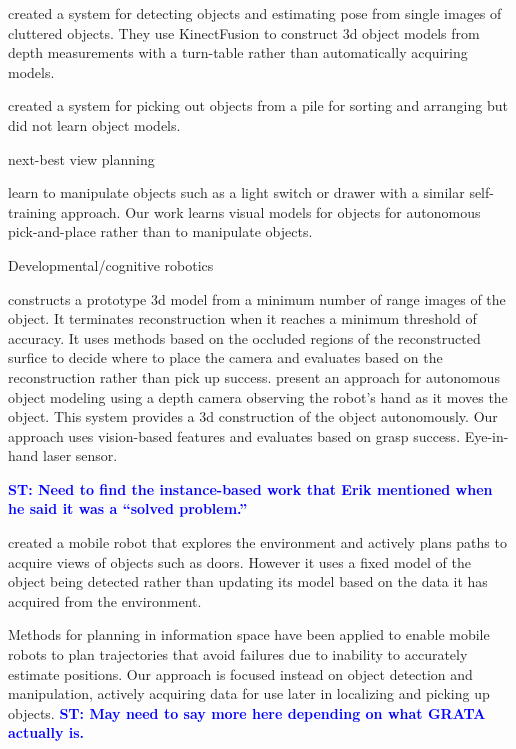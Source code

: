 \documentclass[conference]{IEEEtran}
\newcommand{\stnote}[1]{\textcolor{blue}{\textbf{ST: #1}}}
\begin{document}
\citet{zhu14} created a system for detecting objects and estimating
pose from single images of cluttered objects.  They use KinectFusion
to construct 3d object models from depth measurements with a
turn-table rather than automatically acquiring models.

\citet{chang12} created a system for picking out objects from a pile
for sorting and arranging but did not learn object models.  

next-best view planning~\citep{kriegel11}

\citet{nguyen14} learn to manipulate objects such as a light switch or
drawer with a similar self-training approach.  Our work learns visual
models for objects for autonomous pick-and-place rather than to
manipulate objects.

Developmental/cognitive robotics~\citep{lyubova13, kraft10r}

\citet{banta00} constructs a prototype 3d model from a minimum number
of range images of the object.  It terminates reconstruction when it
reaches a minimum threshold of accuracy.  It uses methods based on the
occluded regions of the reconstructed surfice to decide where to place
the camera and evaluates based on the reconstruction rather than pick
up success.  \citet{krainin11} present an approach for autonomous
object modeling using a depth camera observing the robot's hand as it
moves the object.  This system provides a 3d construction of the
object autonomously.  Our approach uses vision-based features and
evaluates based on grasp success.  Eye-in-hand laser
sensor.~\citep{aeotti14}

\stnote{Need to find the instance-based work that Erik mentioned when
  he said it was a ``solved problem.''}

\citet{velez11} created a mobile robot that explores the environment
and actively plans paths to acquire views of objects such as doors.
However it uses a fixed model of the object being detected rather than
updating its model based on the data it has acquired from the
environment.

Methods for planning in information space \citep{he08, atanasov13,
  prentice09} have been applied to enable mobile robots to plan
trajectories that avoid failures due to inability to accurately
estimate positions.  Our approach is focused instead on
object detection and manipulation, actively acquiring data for use
later in localizing and picking up objects. \stnote{May need to say
  more here depending on what GRATA actually is.}
\end{document}
